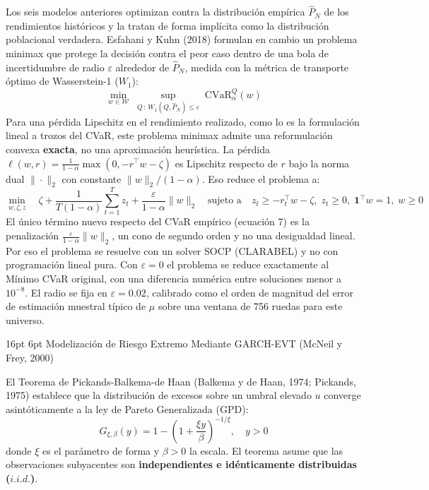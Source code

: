 \documentclass[11pt,a4paper]{article}
\makeatletter
\renewcommand\section{\@startsection{section}{1}{\z@}%
  {16pt \@plus 3pt \@minus 2pt}%
  {6pt}%
  {\centering\large\bfseries\color{navyblue}}}
\makeatother
\begin{document}
Los seis modelos anteriores optimizan contra la distribución empírica $\hat{P}_N$ de los rendimientos históricos y la tratan de forma implícita como la distribución poblacional verdadera. Esfahani y Kuhn (2018) formulan en cambio un problema minimax que protege la decisión contra el peor caso dentro de una bola de incertidumbre de radio $\varepsilon$ alrededor de $\hat{P}_N$, medida con la métrica de transporte óptimo de Wasserstein-1 ($W_1$):
\begin{equation}
\min_{w \in \mathcal{W}} \; \sup_{Q \,:\, W_1(Q, \hat{P}_N) \le \varepsilon} \; \mathrm{CVaR}_{\alpha}^{Q}(w)
\end{equation}
Para una pérdida Lipschitz en el rendimiento realizado, como lo es la formulación lineal a trozos del CVaR, este problema minimax admite una reformulación convexa \textbf{exacta}, no una aproximación heurística. La pérdida $\ell(w, r) = \frac{1}{1-\alpha}\max(0, -r^\top w - \zeta)$ es Lipschitz respecto de $r$ bajo la norma dual $\|\cdot\|_2$ con constante $\|w\|_2 / (1-\alpha)$. Eso reduce el problema a:
\begin{equation}
\min_{w, \zeta, z} \quad \zeta + \frac{1}{T(1-\alpha)}\sum_{t=1}^{T} z_t + \frac{\varepsilon}{1-\alpha}\|w\|_2 \quad \text{sujeto a} \quad z_t \ge -r_t^\top w - \zeta, \; z_t \ge 0, \; \mathbf{1}^\top w = 1, \; w \ge 0
\end{equation}
El único término nuevo respecto del CVaR empírico (ecuación 7) es la penalización $\frac{\varepsilon}{1-\alpha}\|w\|_2$, un cono de segundo orden y no una desigualdad lineal. Por eso el problema se resuelve con un solver SOCP (CLARABEL) y no con programación lineal pura. Con $\varepsilon = 0$ el problema se reduce exactamente al Mínimo CVaR original, con una diferencia numérica entre soluciones menor a $10^{-8}$. El radio se fija en $\varepsilon = 0.02$, calibrado como el orden de magnitud del error de estimación muestral típico de $\hat{\mu}$ sobre una ventana de 756 ruedas para este universo.

\section{Modelización de Riesgo Extremo Mediante GARCH-EVT (McNeil y Frey, 2000)}

El Teorema de Pickands-Balkema-de Haan (Balkema y de Haan, 1974; Pickands, 1975) establece que la distribución de excesos sobre un umbral elevado $u$ converge asintóticamente a la ley de Pareto Generalizada (GPD):
\begin{equation}
G_{\xi, \beta}(y) = 1 - \left(1 + \frac{\xi y}{\beta}\right)^{-1/\xi}, \quad y > 0
\end{equation}
donde $\xi$ es el parámetro de forma y $\beta > 0$ la escala. El teorema asume que las observaciones subyacentes son \textbf{independientes e idénticamente distribuidas ($i.i.d.$)}.
\end{document}
